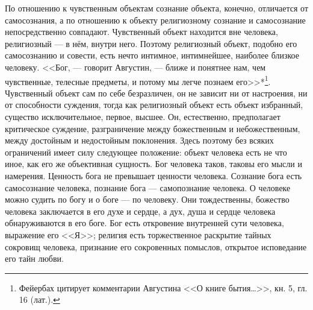 \documentclass[12pt,oneside]{book}
\newcommand{\rom}[1]{\uppercase\expandafter{\romannumeral #1\relax}}
\begin{document}
По отношению к чувственным объектам сознание объекта, конечно, отличается от самосознания, а по отношению к объекту религиозному сознание и самосознание непосредственно совпадают. Чувственный объект находится вне человека, религиозный --- в нём, внутри него. Поэтому религиозный объект, подобно его самосознанию и совести, есть нечто интимное, интимнейшее, наиболее близкое человеку. <<Бог, --- говорит Августин, --- ближе и понятнее нам, чем чувственные, телесные предметы, и потому мы легче познаем его>>*\let\svthefootnote\thefootnote\let\thefootnote\relax\footnotetext{*<<De genesi ad litteram>>, lib. \rom{5}, c. 16.}\let\thefootnote\svthefootnote\footnote{Фейербах цитирует комментарии Августина <<О книге бытия\dots>>, кн. 5, гл. 16 (лат.).}. Чувственный объект сам по себе безразличен, он не зависит ни от настроения, ни от способности суждения, тогда как религиозный объект есть объект избранный, существо исключительное, первое, высшее. Он, естественно, предполагает критическое суждение, разграничение между божественным и небожественным, между достойным и недостойным поклонения\dag\let\svthefootnote\thefootnote\let\thefootnote\relax{}\let\thefootnote\svthefootnote. Здесь поэтому без всяких ограничений имеет силу следующее положение: объект человека есть не что иное, как его же объективная сущность. Бог человека таков, таковы его мысли и намерения. Ценность бога не превышает ценности человека. Сознание бога есть самосознание человека, познание бога --- самопознание человека. О человеке можно судить по богу и о боге --- по человеку. Они тождественны, божество человека заключается в его духе и сердце, а дух, душа и сердце человека обнаруживаются в его боге. Бог есть откровение внутренней сути человека, выражение его <<Я>>; религия есть торжественное раскрытие тайных сокровищ человека, признание его сокровенных помыслов, открытое исповедание его тайн любви.
\end{document}
